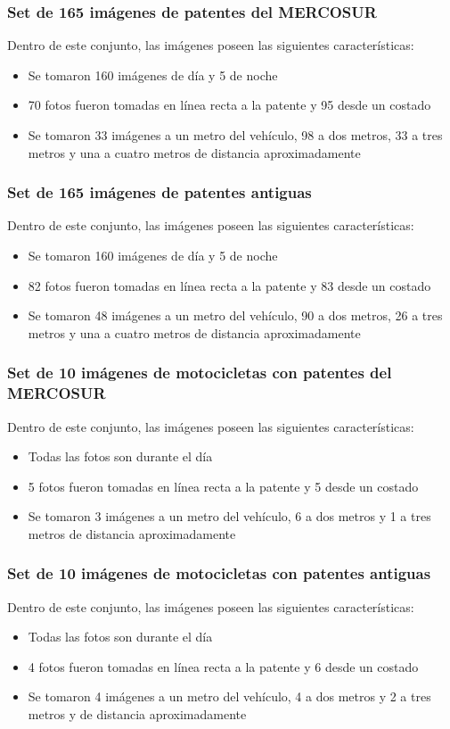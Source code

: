 \subsubsection{Set de 165 imágenes de patentes del MERCOSUR}
Dentro de este conjunto, las imágenes poseen las siguientes características:
\begin{itemize}
	\item Se tomaron 160 imágenes de día y 5 de noche
	\item 70 fotos fueron tomadas en línea recta a la patente y 95 desde un costado
	\item Se tomaron 33 imágenes a un metro del vehículo, 98 a dos metros, 33 a tres metros y una a cuatro metros de distancia aproximadamente
\end{itemize}

\subsubsection{Set de 165 imágenes de patentes antiguas}
Dentro de este conjunto, las imágenes poseen las siguientes características:
\begin{itemize}
	\item Se tomaron 160 imágenes de día y 5 de noche
	\item 82 fotos fueron tomadas en línea recta a la patente y 83 desde un costado
	\item Se tomaron 48 imágenes a un metro del vehículo, 90 a dos metros, 26 a tres metros y una a cuatro metros de distancia aproximadamente
\end{itemize}

\subsubsection{Set de 10 imágenes de motocicletas con patentes del MERCOSUR}
Dentro de este conjunto, las imágenes poseen las siguientes características:
\begin{itemize}
	\item Todas las fotos son durante el día
	\item 5 fotos fueron tomadas en línea recta a la patente y 5 desde un costado
	\item Se tomaron 3 imágenes a un metro del vehículo, 6 a dos metros y 1 a tres metros de distancia aproximadamente
\end{itemize}

\subsubsection{Set de 10 imágenes de motocicletas con patentes antiguas}
Dentro de este conjunto, las imágenes poseen las siguientes características:
\begin{itemize}
	\item Todas las fotos son durante el día
	\item 4 fotos fueron tomadas en línea recta a la patente y 6 desde un costado
	\item Se tomaron 4 imágenes a un metro del vehículo, 4 a dos metros y 2 a tres metros y de distancia aproximadamente
\end{itemize}


